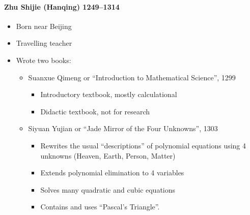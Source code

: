 \documentclass[class=article, crop=false]{standalone}
\begin{document}
  \paragraph{Zhu Shijie (Hanqing) 1249--1314}
  \begin{itemize}
    \item Born near Beijing
    \item Travelling teacher
    \item Wrote two books:
    \begin{itemize}
      \item Suanxue Qimeng or ``Introduction to Mathematical Science'', 1299
      \begin{itemize}
        \item Introductory textbook, mostly calculational
        \item Didactic textbook, not for research
      \end{itemize}
      \item Siyuan Yujian or ``Jade Mirror of the Four Unknowns'', 1303
      \begin{itemize}
        \item Rewrites the usual ``descriptions'' of polynomial equations using 4 unknowns (Heaven, Earth, Person, Matter)
        \item Extends polynomial elimination to 4 variables
        \item Solves many quadratic and cubic equations
        \item Contains and uses ``Pascal's Triangle''.
      \end{itemize}
    \end{itemize}
  \end{itemize}
\end{document}

